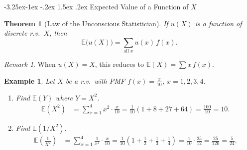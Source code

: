\documentclass{article}
\makeatletter
\newtheorem{theorem}{Theorem}[section]
\newtheorem{example}{Example}[section]
\theoremstyle{remark}
\newtheorem*{remark}{Remark}
\newlength{\subsecindent}
\renewcommand\subsection{\@startsection{subsection}{2}{\subsecindent}%
  {-3.25ex\@plus -1ex \@minus -.2ex}%
  {1.5ex \@plus .2ex}%
  {\normalfont\large\bfseries}}
\newenvironment{sub}{%
  \begin{list}{}{%
    \setlength{\leftmargin}{4em}%
    \setlength{\rightmargin}{0pt}%
    \setlength{\topsep}{0pt}%
    \setlength{\partopsep}{0pt}%
    \setlength{\parsep}{\parskip}%
    \setlength{\itemsep}{\parskip}%
  }\item\relax
}{\end{list}}
\newcommand{\E}{\mathbb{E}}
\makeatother
\begin{document}
\subsection{Expected Value of a Function of $X$}
\begin{sub}

\begin{theorem}[Law of the Unconscious Statistician]
  \label{thm:lotus}
  If $u(X)$ is a function of discrete r.v.\ $X$, then
  \begin{equation}
    \E\bigl(u(X)\bigr) = \sum_{\text{all } x} u(x) \, f(x).
    \label{eq:lotus}
  \end{equation}
\end{theorem}

\begin{remark}
  When $u(X) = X$, this reduces to $\E(X) = \sum x \, f(x)$.
\end{remark}

\begin{example}
  \label{ex:lotus}
  Let $X$ be a r.v.\ with PMF $f(x) = \frac{x}{10}$, $x = 1, 2, 3, 4$.
  \begin{enumerate}
    \item Find $\E(Y)$ where $Y = X^2$.
      \begin{align*}
        \E(X^2) &= \sum_{x=1}^{4} x^2 \cdot \frac{x}{10}
                 = \frac{1}{10}(1 + 8 + 27 + 64) = \frac{100}{10} = 10.
      \end{align*}
    \item Find $\E(1/X^2)$.
      \begin{align*}
        \E\!\left(\frac{1}{X^2}\right)
          &= \sum_{x=1}^{4} \frac{1}{x^2} \cdot \frac{x}{10}
           = \frac{1}{10}\!\left(1 + \frac{1}{2} + \frac{1}{3} + \frac{1}{4}\right)
           = \frac{1}{10} \cdot \frac{25}{12}
           = \frac{25}{120} = \frac{5}{24}.
      \end{align*}
  \end{enumerate}
\end{example}

\end{sub}
\end{document}
